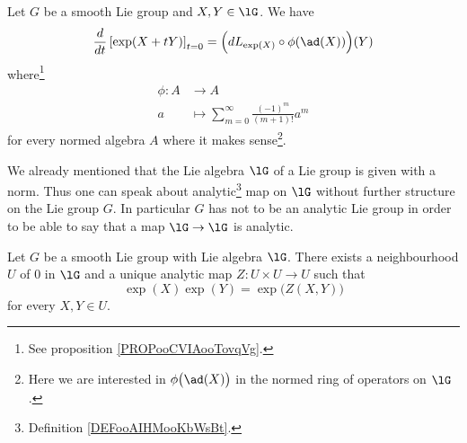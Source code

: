 \begin{lemma}	\label{LEMooTXNVooYmZDOl}
	Let \( G\) be a smooth Lie group and \( X,Y\in\lG\). We have
	\begin{equation}
		\frac{d}{dt} \left[ \exp(X+tY)  \right]_{t=0}=\Big( dL_{\exp(X)}\circ\phi(\ad(X)) \Big)(Y)
	\end{equation}
	where\footnote{See proposition \ref{PROPooCVIAooTovqVg}.}
	\begin{equation}
		\begin{aligned}
			\phi\colon A & \to A                                                   \\
			a            & \mapsto \sum_{m=0}^{\infty}\frac{ (-1)^m }{ (m+1)! }a^m
		\end{aligned}
	\end{equation}
	for every normed algebra \( A\) where it makes sense\footnote{Here we are interested in \( \phi\big(\ad(X)\big)\) in the normed ring of operators on \( \lG\).}.
\end{lemma}


\begin{normaltext}
	We already mentioned that the Lie algebra \( \lG\) of a Lie group is given with a norm. Thus one can speak about analytic\footnote{Definition \ref{DEFooAIHMooKbWsBt}.} map on \( \lG\) without further structure on the Lie group \( G\). In particular \( G\) has not to be an analytic Lie group in order to be able to say that a map \( \lG\to \lG\) is analytic.
\end{normaltext}

\begin{theorem}     \label{THOooYJPEooSpKHnC}
	Let \( G\) be a smooth Lie group with Lie algebra \( \lG\). There exists a neighbourhood \( U\) of \( 0\) in \( \lG\) and a unique analytic map \(Z \colon U\times U\to U \) such that
	\begin{equation}
		\exp(X)\exp(Y)=\exp\big( Z(X,Y) \big)
	\end{equation}
	for every \( X,Y\in U\).

\end{theorem}

